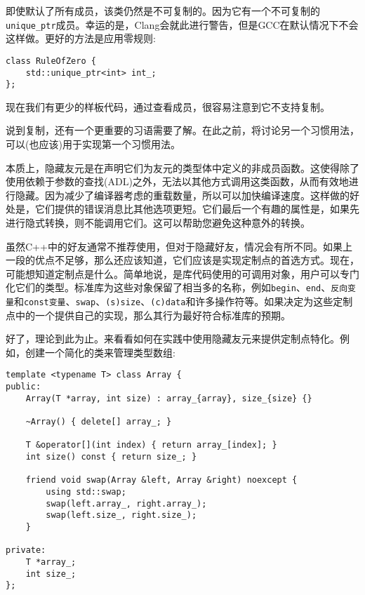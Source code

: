 即使默认了所有成员，该类仍然是不可复制的。因为它有一个不可复制的\texttt{unique\_ptr}成员。幸运的是，Clang会就此进行警告，但是GCC在默认情况下不会这样做。更好的方法是应用零规则:

\begin{lstlisting}[style=styleCXX]
class RuleOfZero {
	std::unique_ptr<int> int_;
};
\end{lstlisting}

现在我们有更少的样板代码，通过查看成员，很容易注意到它不支持复制。

说到复制，还有一个更重要的习语需要了解。在此之前，将讨论另一个习惯用法，可以(也应该)用于实现第一个习惯用法。


本质上，隐藏友元是在声明它们为友元的类型体中定义的非成员函数。这使得除了使用依赖于参数的查找(ADL)之外，无法以其他方式调用这类函数，从而有效地进行隐藏。因为减少了编译器考虑的重载数量，所以可以加快编译速度。这样做的好处是，它们提供的错误消息比其他选项更短。它们最后一个有趣的属性是，如果先进行隐式转换，则不能调用它们。这可以帮助您避免这种意外的转换。

虽然C++中的好友通常不推荐使用，但对于隐藏好友，情况会有所不同。如果上一段的优点不足够，那么还应该知道，它们应该是实现定制点的首选方式。现在，可能想知道定制点是什么。简单地说，是库代码使用的可调用对象，用户可以专门化它们的类型。标准库为这些对象保留了相当多的名称，例如\texttt{begin}、\texttt{end}、\texttt{反向变量}和\texttt{const变量}、\texttt{swap}、\texttt{(s)size}、\texttt{(c)data}和许多操作符等。如果决定为这些定制点中的一个提供自己的实现，那么其行为最好符合标准库的预期。

好了，理论到此为止。来看看如何在实践中使用隐藏友元来提供定制点特化。例如，创建一个简化的类来管理类型数组:

\begin{lstlisting}[style=styleCXX]
template <typename T> class Array {
public:
	Array(T *array, int size) : array_{array}, size_{size} {}
	
	~Array() { delete[] array_; }
	
	T &operator[](int index) { return array_[index]; }
	int size() const { return size_; }
	
	friend void swap(Array &left, Array &right) noexcept {
		using std::swap;
		swap(left.array_, right.array_);
		swap(left.size_, right.size_);
	}

private:
	T *array_;
	int size_;
};
\end{lstlisting}

